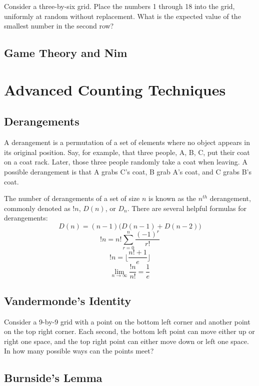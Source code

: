 \documentclass[12pt]{book}
\begin{document}
\begin{propc}
    Consider a three-by-six grid. Place the numbers 1 through 18 into the grid, uniformly at random without replacement. What is the expected value of the smallest number in the second row?
\end{propc}


\section{Game Theory and Nim}


\chapter{Advanced Counting Techniques}
\section{Derangements}
A derangement is a permutation of a set of elements where no object appears in its original position. Say, for example, that three people, A, B, C, put their coat on a coat rack. Later, those three people randomly take a coat when leaving. A possible derangement is that A grabs C's coat, B grab A's coat, and C grabs B's coat. \par \vspace{3pt}
The number of derangements of a set of size $n$ is known as the $n^{th}$ derangement, commonly denoted as $!n$, $D(n)$, or $D_n$. There are several helpful formulas for derangements:
\[D(n)=(n-1)\bigl(D(n-1)+D(n-2)\bigr)\]
\[!n=n!\sum_{r=0}^{n}\frac{(-1)^r}{r!}\]
\[!n=\lfloor \frac{n!+1}{e} \rfloor\]
\[\lim_{n\rightarrow\infty} \frac{!n}{n!}=\frac{1}{e}\]

\section{Vandermonde's Identity}

\begin{propc}
    Consider a 9-by-9 grid with a point on the bottom left corner and another point on the top right corner. Each second, the bottom left point can move either up or right one space, and the top right point can either move down or left one space. In how many possible ways can the points meet?
\end{propc}

\section{Burnside's Lemma}
\end{document}

